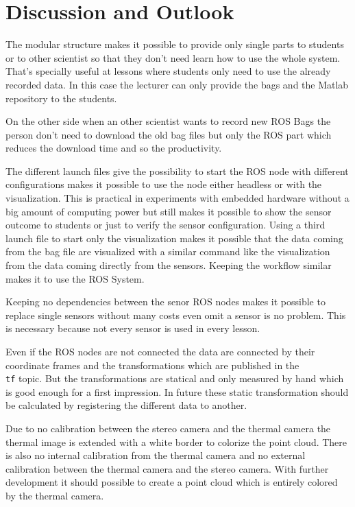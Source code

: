 \chapter{Discussion and Outlook}\label{ch:discussionAndOutlook}

The modular structure makes it possible to provide only single parts to students or to other scientist so that they don't need learn how to use the whole system.
That's specially useful at lessons where students only need to use the already recorded data.
In this case the lecturer can only provide the bags and the Matlab repository to the students.

On the other side when an other scientist wants to record new ROS Bags the person don't need to download the old bag files but only the ROS part which reduces the download time and so the productivity.

The different launch files give the possibility to start the ROS node with different configurations makes it possible to use the node either headless or with the visualization.
This is practical in experiments with embedded hardware without a big amount of computing power but still makes it possible to show the sensor outcome to students or just to verify the sensor configuration.
Using a third launch file to start only the visualization makes it possible that the data coming from the bag file are visualized with a similar command like the visualization from the data coming directly from the sensors.
Keeping the workflow similar makes it to use the ROS System.

Keeping no dependencies between the senor ROS nodes makes it possible to replace single sensors without many costs even omit a sensor is no problem.
This is necessary because not every sensor is used in every lesson.

Even if the ROS nodes are not connected the data are connected by their coordinate frames and the transformations which are published in the \texttt{\\tf} topic.
But the transformations are statical and only measured by hand which is good enough for a first impression.
In future these static transformation should be calculated by registering the different data to another.

Due to no calibration between the stereo camera and the thermal camera the thermal image is extended with a white border to colorize the point cloud.
There is also no internal calibration from the thermal camera and no external calibration between the thermal camera and the stereo camera.
With further development it should possible to create a point cloud which is entirely colored by the thermal camera.

